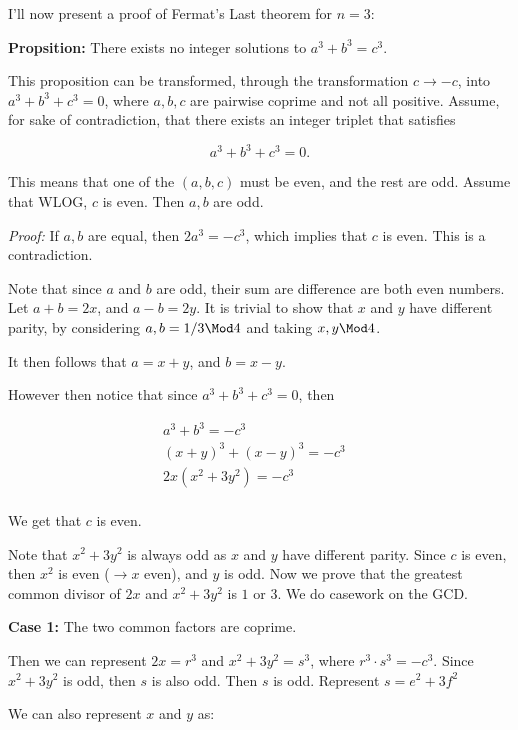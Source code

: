 \documentclass[a4paper, 12pt,oneside,openany]{book}
\begin{document}
I'll now present a proof of Fermat's Last theorem for $n=3$:

\textbf{Propsition:} There exists no integer solutions to $a^3+b^3=c^3$.

This proposition can be transformed, through the transformation $c \rightarrow -c$, into $a^3+b^3+c^3=0$, where $a, b, c$ are pairwise coprime and not all positive. Assume, for sake of contradiction, that there exists an integer triplet that satisfies 

\begin{equation}
	a^3+b^3+c^3=0.
\end{equation}

This means that one of the $(a, b, c)$ must be even, and the rest are odd. Assume that WLOG, $c$ is even. Then $a, b$ are odd. 


\emph{Proof:} If $a, b$ are equal, then $2a^3=-c^3$, which implies that $c$ is even. This is a contradiction.

Note that since $a$ and $b$ are odd, their sum are difference are both even numbers. Let $a+b=2x$, and $a-b=2y$. It is trivial to show that $x$ and $y$ have different parity, by considering $a, b =1 / 3 \Mod 4$ and taking $x, y \Mod 4$.

It then follows that $a = x+y$, and $b=x-y$.

However then notice that since $a^3+b^3+c^3=0$, then

\begin{align*}
	a^3+b^3=-c^3 & \\
	(x+y)^3 + (x-y)^3 = -c^3 & \\
	2x(x^2+3y^2) = -c^3 & \\
\end{align*}

We get that $c$ is even.

Note that $x^2+3y^2$ is always odd as $x$ and $y$ have different parity. Since $c$ is even, then $x^2$ is even ($\rightarrow x$ even), and $y$ is odd. Now we prove that the greatest common divisor of $2x$ and $x^2+3y^2$ is $1$ or $3$. We do casework on the GCD.

\textbf{Case 1:} The two common factors are coprime.

Then we can represent $2x = r^3$ and $x^2+3y^2=s^3$, where $r^3 \cdot s^3 = -c^3$. Since $x^2+3y^2$ is odd, then $s$ is also odd. Then $s$ is odd. Represent $s = e^2+3f^2$

We can also represent $x$ and $y$ as:
\end{document}
